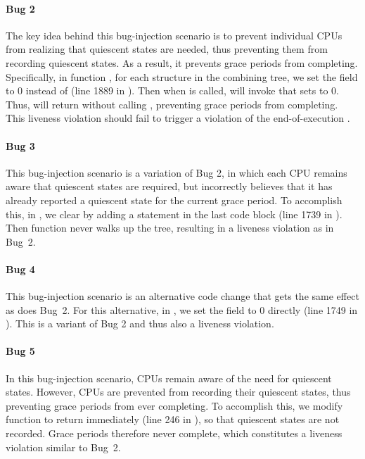 \paragraph*{Bug 2}
The key idea behind this bug-injection scenario is to prevent individual
CPUs from realizing that quiescent states are needed, thus preventing
them from recording quiescent states. As a result, it prevents grace periods
from completing.
Specifically, in function , for each 
structure in the combining tree,
we set the field  to 0 instead of  (line 1889 in ). 
Then when  is called,  will invoke
 that sets  to 0. Thus,  
 will return without calling ,
preventing grace periods from completing.
This liveness violation should fail to trigger a violation of the end-of-execution
.

\paragraph*{Bug 3}
This bug-injection scenario is a variation of Bug 2, in
which each CPU remains aware that quiescent states are required, but
incorrectly believes that it has already reported a quiescent state
for the current grace period.
To accomplish this,
in , we clear  by adding a statement
 in the last  code block (line 1739 in ). 
Then function  never walks up the 
tree, resulting in a liveness violation as in Bug~2.

\paragraph*{Bug 4}
This bug-injection scenario is an alternative code change that gets the
same effect as does Bug~2.
For this alternative,
in , we set the  field to 0 directly 
(line 1749 in ). This is a variant of Bug 2 and thus also
a liveness violation.

\paragraph*{Bug 5}
In this bug-injection scenario, CPUs remain aware of the need for
quiescent states.
However, CPUs are prevented from recording their
quiescent states, thus preventing grace periods from ever completing.
To accomplish this, we modify
function  to return immediately (line 246 in ),
so that quiescent states are not recorded.
Grace periods therefore never complete, which constitutes a liveness
violation similar to Bug~2.


